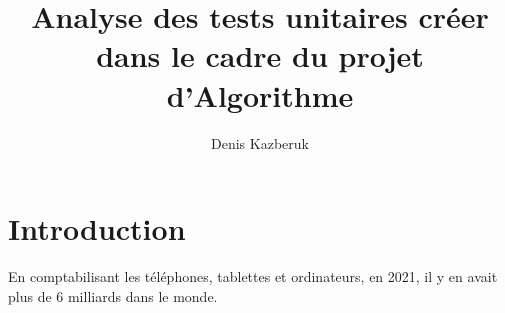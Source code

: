 \documentclass[11pt,a4paper]{article}
\author{Denis Kazberuk}
\title{Analyse des tests unitaires créer dans le cadre du projet d'Algorithme}
\begin{document}
\maketitle
\newpage
\renewcommand{\contentsname}{Table des matières}
\tableofcontents
\newpage
\section{Introduction}
En comptabilisant les téléphones, tablettes et ordinateurs, en 2021, il y en avait plus de 6 milliards dans le monde\cite{appareil}.



\end{document}
